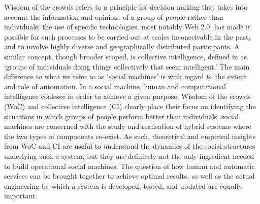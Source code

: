 \documentclass{www13-companion-accepted}
\begin{document}
Wisdom of the crowds \cite{surowiecki2005wisdom} refers to a principle for decision making that takes into account the information and opinions of a group of people rather than individuals; the use of specific technologies, most notably Web $2.0$, has made it possible for such processes to be carried out at scales inconceivable in the past, and to involve highly diverse and geographically distributed participants. A similar concept, though broader scoped, is collective intelligence, defined in \cite{malone2009harnessing} as `groups of individuals doing things collectively that seem intelligent.' The main difference to what we refer to as `social machines' is with regard to the extent and role of automation. In a social machine, human and computational intelligence coalesce in order to achieve a given purpose. Wisdom of the crowds (WoC) and collective intelligence (CI) clearly place their focus on identifying the situations in which groups of people perform better than individuals, social machines are concerned with the study and realisation of hybrid systems where the two types of components co-exist. As such, theoretical and empirical insights from WoC and CI are useful to understand the dynamics of the social structures underlying such a system, but they are definitely not the only ingredient needed to build operational social machines. The question of how human and automatic services can be brought together to achieve optimal results, as well as the actual engineering by which a system is developed, tested, and updated are equally important.
\end{document}
